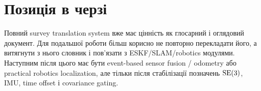 \section{Позиція в черзі}

Повний survey translation system вже має цінність як глосарний і оглядовий документ. Для подальшої роботи більш корисно не повторно перекладати його, а витягнути з нього словник і пов'язати з ESKF/SLAM/robotics модулями. Наступним після цього має бути event-based sensor fusion / odometry або practical robotics localization, але тільки після стабілізації позначень $\mathrm{SE}(3)$, IMU, time offset і covariance gating.
